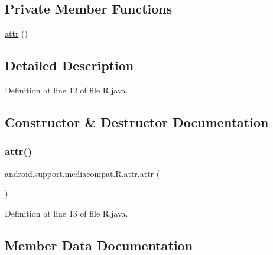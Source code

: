 \subsection*{Private Member Functions}
\begin{DoxyCompactItemize}
\item 
\mbox{\hyperlink{classandroid_1_1support_1_1mediacompat_1_1_r_1_1attr_a39bd6af2f0de210690655a6175c86818}{attr}} ()
\end{DoxyCompactItemize}


\subsection{Detailed Description}


Definition at line 12 of file R.\+java.



\subsection{Constructor \& Destructor Documentation}
\mbox{\label{classandroid_1_1support_1_1mediacompat_1_1_r_1_1attr_a39bd6af2f0de210690655a6175c86818}} 
\subsubsection{\texorpdfstring{attr()}{attr()}}
{\footnotesize\ttfamily android.\+support.\+mediacompat.\+R.\+attr.\+attr (\begin{DoxyParamCaption}{ }\end{DoxyParamCaption})\hspace{0.3cm}{\ttfamily [private]}}



Definition at line 13 of file R.\+java.


\begin{DoxyCode}{0}

\end{DoxyCode}


\subsection{Member Data Documentation}
\mbox{\label{classandroid_1_1support_1_1mediacompat_1_1_r_1_1attr_ade19dd71a2fbc3dcb0f6095fec0e920c}} 
